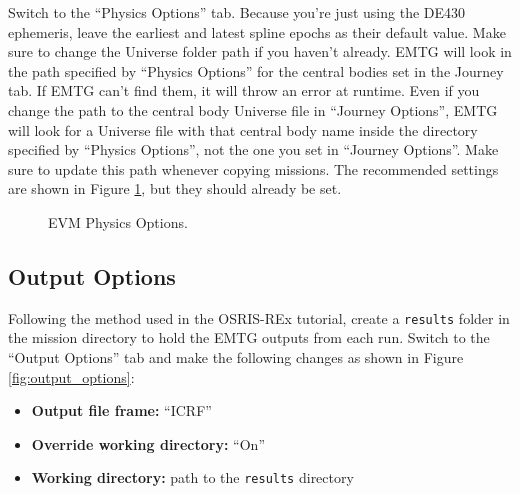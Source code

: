 \documentclass[11pt]{article}
\begin{document}
Switch to the ``Physics Options'' tab. Because you’re just using the DE430 ephemeris, leave the earliest and latest spline epochs as their default value. Make sure to change the Universe folder path if you haven’t already. \ac{EMTG} will look in the path specified by ``Physics Options'' for the central bodies set in the Journey tab. If \ac{EMTG} can’t find them, it will throw an error at runtime. Even if you change the path to the central body Universe file in ``Journey Options'', \ac{EMTG} will look for a Universe file with that central body name inside the directory specified by ``Physics Options'', not the one you set in ``Journey Options''. Make sure to update this path whenever copying missions. The recommended settings are shown in Figure \ref{fig:physics_options}, but they should already be set.

\begin{figure}[H]
	\centering
	\caption{\label{fig:physics_options}EVM Physics Options.}
\end{figure}

\subsection{Output Options}
\label{sec:output_options}

Following the method used in the OSRIS-REx tutorial, create a \texttt{results} folder in the mission directory to hold the \ac{EMTG} outputs from each run. Switch to the ``Output Options'' tab and make the following changes as shown in Figure \ref{fig:output_options}:

\begin{itemize}
	\item \textbf{Output file frame:} ``\acs{ICRF}''
	\item \textbf{Override working directory:} ``On''
	\item \textbf{Working directory:} path to the \texttt{results} directory
\end{itemize}
\end{document}
